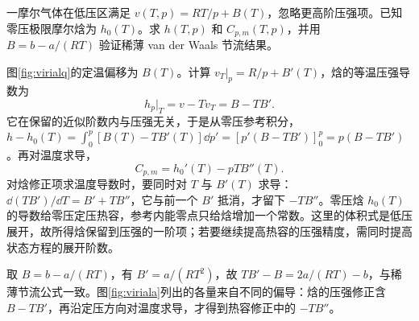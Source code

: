 \begin{example}[由低压体积展开求焓与热容]
一摩尔气体在低压区满足 $v(T,p)=RT/p+B(T)$，忽略更高阶压强项。已知零压极限摩尔焓为 $h_0(T)$。求 $h(T,p)$ 和 $C_{p,m}(T,p)$，并用 $B=b-a/(RT)$ 验证稀薄 van der Waals 节流结果。
\end{example}
\begin{solution}
图\ref{fig:virialq}的定温偏移为 $B(T)$。计算 $v_T|_p=R/p+B'(T)$，焓的等温压强导数为
\[
 h_p|_T=v-Tv_T=B-TB'.
\]
它在保留的近似阶数内与压强无关，于是从零压参考积分，$h-h_0(T)=\int_0^p[B(T)-TB'(T)]\dd p'=[p'(B-TB')]_0^p=p(B-TB')$。再对温度求导，
\[
 C_{p,m}=h_0'(T)-pTB''(T).
\]
对焓修正项求温度导数时，要同时对 $T$ 与 $B'(T)$ 求导：$\dd(TB')/\dd T=B'+TB''$，它与前一个 $B'$ 抵消，才留下 $-TB''$。零压焓 $h_0(T)$ 的导数给零压定压热容，参考内能零点只给焓增加一个常数。这里的体积式是低压展开，故所得焓保留到压强的一阶项；若要继续提高热容的压强精度，需同时提高状态方程的展开阶数。

取 $B=b-a/(RT)$，有 $B'=a/(RT^2)$，故 $TB'-B=2a/(RT)-b$，与稀薄节流公式一致。图\ref{fig:viriala}列出的各量来自不同的偏导：焓的压强修正含 $B-TB'$，再沿定压方向对温度求导，才得到热容修正中的 $-TB''$。
\end{solution}

